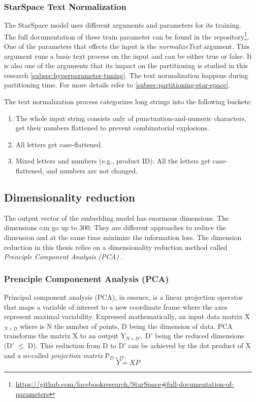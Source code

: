 \subsubsection{StarSpace Text Normalization}
\label{subsubsec:star-space-text-normalization}
The StarSpace model uses different arguments and parameters for its training. The full documentation of these train parameter can be found in the repository\footnote{\url{https://github.com/facebookresearch/StarSpace\#full-documentation-of-parameters}}. One of the parameters that effects the input is the \emph{normalizeText} argument. This argument runs a basic text process on the input and can be either true or false. It is also one of the arguments that its impact on the partitioning is studied in this research \ref{subsec:hyperparameter-tuning}. The text normalization happens during partitioning time. For more details refer to \ref{subsec:partitioning-star-space}.


The text normalization process categorizes long strings into the following buckets:

\begin{enumerate}
    \item The whole input string consists only of punctuation-and-numeric characters, get their numbers flattened to prevent combinatorial explosions.
    \item All letters get case-flattened.
    \item Mixed letters and numbers (e.g., product ID): All the letters get case-flattened, and numbers are not changed.
\end{enumerate}

\subsection{Dimensionality reduction}
\label{subsec:dimension-reduction}
The output vector of the embedding model has enormous dimensions. The dimensions can go up to 300. They are different approaches to reduce the dimension and at the same time minimize the information loss. The dimension reduction in this thesis relies on a dimensionality reduction method called \emph{Prenciple Component Analysis (PCA)} \cite{woldPrincipalComponentAnalysis1987}.

\subsubsection{Prenciple Componenent Analysis (PCA)}
\label{subsubsec:pca}
Principal component analysis (PCA), in essence, is a linear projection operator that maps a variable of interest to a new coordinate frame where the axes represent maximal variability. Expressed mathematically, an input data matrix X$_{N \times D}$ where is N the number of points, D being the dimension of data. PCA transforms the matrix X to an output Y$_{N \times D\prime}$. D$\prime$ being the reduced dimensions (D$\prime$ $\leq$ D). This reduction from D to D$\prime$ can be achieved by the dot product of X and a so-called \emph{projection matrix} P$_{D \times D\prime}$.
    \begin{equation}
        \label{PCA}
        Y = XP
    \end{equation}

